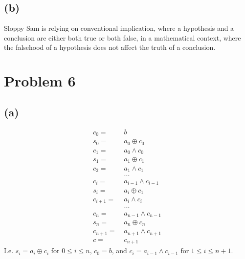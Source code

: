 \documentclass{article}
\begin{document}
\subsection{(b)} Sloppy Sam is relying on conventional implication, where a hypothesis and a conclusion are either both true or both false, in a mathematical context, where the falsehood of a hypothesis does not affect the truth of a conclusion.

\pagebreak

\section{Problem 6}
\subsection{(a)}
\begin{align*}
	c_0 = \;     & b                     \\
	s_0 = \;     & a_0 \oplus c_0        \\
	c_1 = \;     & a_0 \land c_0         \\
	s_1 = \;     & a_1 \oplus c_1        \\
	c_2 = \;     & a_1 \land c_1         \\
	             & ...                   \\
	c_i = \;     & a_{i-1} \land c_{i-1} \\
	s_i = \;     & a_i \oplus c_1        \\
	c_{i+1} = \; & a_i \land c_i         \\
	             & ...                   \\
	c_{n} = \;   & a_{n-1} \land c_{n-1} \\
	s_n = \;     & a_n \oplus c_n        \\
	c_{n+1} = \; & a_{n+1} \land c_{n+1} \\
	c = \;       & c_{n+1}
\end{align*}
I.e. $s_i = a_i \oplus c_i$ for $0 \leq i \leq n$, $c_0 = b$, and $c_i = a_{i-1} \land c_{i-1}$ for $1 \leq i \leq n+1$.
\end{document}
